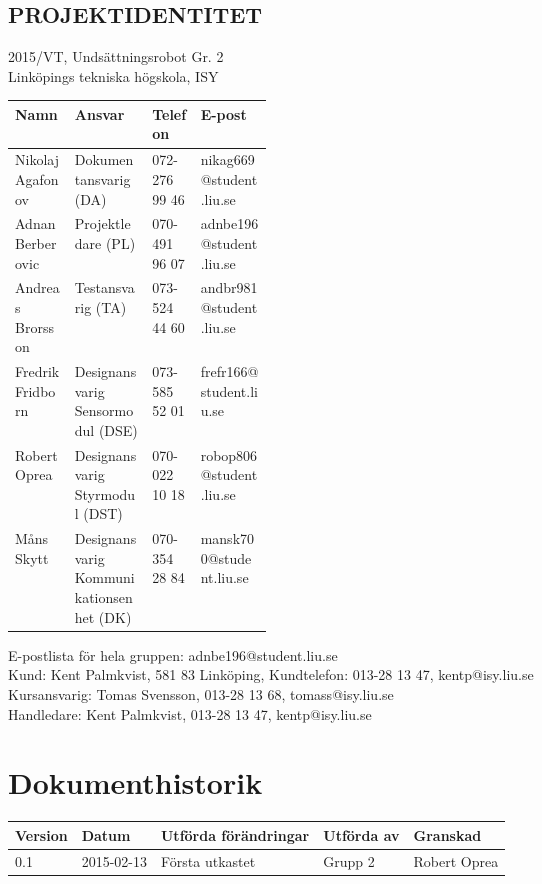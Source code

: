 \documentclass[11pt]{article}
\begin{document}
\pagebreak
\begin{center}

\section*{PROJEKTIDENTITET}
2015/VT, Undsättningsrobot Gr. 2
\\
Linköpings tekniska högskola, ISY
\\[0.5in]
\begin{table}[h]
\begin{tabular}{|l|p{0.3\linewidth}|l|l|} \hline
Namn & Ansvar & Telefon & E-post \\[0.1in] \hline
Nikolaj Agafonov & Dokumentansvarig (DA) & 072-276 99 46 & nikag669@student.liu.se \\ \hline
Adnan Berberovic & Projektledare (PL) & 070-491 96 07 & adnbe196@student.liu.se \\ \hline
Andreas Brorsson & Testansvarig (TA) & 073-524 44 60 & andbr981@student.liu.se \\ \hline
Fredrik Fridborn & Designansvarig Sensormodul (DSE) & 073-585 52 01 & frefr166@student.liu.se \\ \hline
Robert Oprea & Designansvarig Styrmodul (DST) & 070-022 10 18 & robop806@student.liu.se \\ \hline
Måns Skytt & Designansvarig Kommunikationsenhet (DK) & 070-354 28 84 & mansk700@student.liu.se \\ \hline
\end{tabular}
\end{table}

E-postlista för hela gruppen: adnbe196@student.liu.se
\\[1in]
Kund: Kent Palmkvist, 581 83 Linköping,
Kundtelefon: 013-28 13 47, kentp@isy.liu.se
\\[1in]
Kursansvarig: Tomas Svensson, 013-28 13 68, tomass@isy.liu.se
\\
Handledare: Kent Palmkvist, 013-28 13 47, kentp@isy.liu.se
\end{center}
\pagebreak

\tableofcontents

\pagebreak

\section*{Dokumenthistorik}
\begin{table}[h]
\begin{tabular}{|l|l|l|l|l|} \hline

Version & 
Datum & 
Utförda förändringar & 
Utförda av & 
Granskad \\[0.1in] \hline
0.1 &
2015-02-13 & 
Första utkastet & 
Grupp 2 & 
Robert Oprea \\ \hline

\end{tabular}
\end{table}
\end{document}
